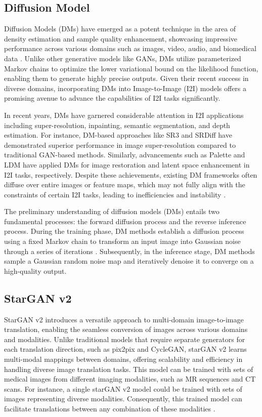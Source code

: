 \documentclass[UKenglish,12pt]{master-style}
\begin{document}
\subsection*{Diffusion Model}

Diffusion Models (DMs) have emerged as a potent technique in the area of density estimation and sample quality enhancement, showcasing impressive performance across various domains such as images, video, audio, and biomedical data \cite{DiffI2I}. Unlike other generative models like GANs, DMs utilize parameterized Markov chains to optimize the lower variational bound on the likelihood function, enabling them to generate highly precise outputs. Given their recent success in diverse domains, incorporating DMs into Image-to-Image (I2I) models offers a promising avenue to advance the capabilities of I2I tasks significantly.

In recent years, DMs have garnered considerable attention in I2I applications including super-resolution, inpainting, semantic segmentation, and depth estimation. For instance, DM-based approaches like SR3 and SRDiff have demonstrated superior performance in image super-resolution compared to traditional GAN-based methods. Similarly, advancements such as Palette and LDM have applied DMs for image restoration and latent space enhancement in I2I tasks, respectively. Despite these achievements, existing DM frameworks often diffuse over entire images or feature maps, which may not fully align with the constraints of certain I2I tasks, leading to inefficiencies and instability \cite{DiffI2I}.

The preliminary understanding of diffusion models (DMs) entails two fundamental processes: the forward diffusion process and the reverse inference process. During the training phase, DM methods establish a diffusion process using a fixed Markov chain to transform an input image into Gaussian noise through a series of iterations \cite{DiffI2I}. Subsequently, in the inference stage, DM methods sample a Gaussian random noise map and iteratively denoise it to converge on a high-quality output.

\subsection*{StarGAN v2}

StarGAN v2 introduces a versatile approach to multi-domain image-to-image translation, enabling the seamless conversion of images across various domains and modalities. Unlike traditional models that require separate generators for each translation direction, such as pix2pix and CycleGAN, starGAN v2 learns multi-modal mappings between domains, offering scalability and efficiency in handling diverse image translation tasks. This model can be trained with sets of medical images from different imaging modalities, such as MR sequences and CT scans. For instance, a single starGAN v2 model could be trained with sets of images representing diverse modalities. Consequently, this trained model can facilitate translations between any combination of these modalities \cite{Chakraborty_2024} .
\end{document}
